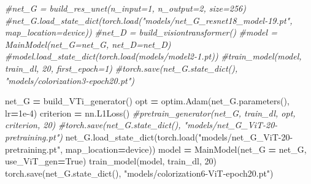 \documentclass[
]{article}
\newenvironment{Shaded}{\begin{snugshade}}{\end{snugshade}}
\newcommand{\CommentTok}[1]{\textcolor[rgb]{0.56,0.35,0.01}{\textit{#1}}}
\newcommand{\DecValTok}[1]{\textcolor[rgb]{0.00,0.00,0.81}{#1}}
\newcommand{\FloatTok}[1]{\textcolor[rgb]{0.00,0.00,0.81}{#1}}
\newcommand{\NormalTok}[1]{#1}
\newcommand{\OperatorTok}[1]{\textcolor[rgb]{0.81,0.36,0.00}{\textbf{#1}}}
\newcommand{\StringTok}[1]{\textcolor[rgb]{0.31,0.60,0.02}{#1}}
\newcommand{\VariableTok}[1]{\textcolor[rgb]{0.00,0.00,0.00}{#1}}
\begin{document}
\begin{Shaded}
\begin{Highlighting}[]
\CommentTok{\#net\_G = build\_res\_unet(n\_input=1, n\_output=2, size=256)}
\CommentTok{\#net\_G.load\_state\_dict(torch.load("models/net\_G\_resnet18\_model{-}19.pt", map\_location=device))}
\CommentTok{\#net\_D = build\_visiontransformer()}
\CommentTok{\#model = MainModel(net\_G=net\_G, net\_D=net\_D)}
\CommentTok{\#model.load\_state\_dict(torch.load(\textquotesingle{}models/model2{-}1.pt\textquotesingle{}))}
\CommentTok{\#train\_model(model, train\_dl, 20, first\_epoch=1)}
\CommentTok{\#torch.save(net\_G.state\_dict(), "models/colorization3{-}epoch20.pt")}
\end{Highlighting}
\end{Shaded}

\begin{Shaded}
\begin{Highlighting}[]
\NormalTok{net\_G }\OperatorTok{=}\NormalTok{ build\_VTi\_generator()}
\NormalTok{opt }\OperatorTok{=}\NormalTok{ optim.Adam(net\_G.parameters(), lr}\OperatorTok{=}\FloatTok{1e{-}4}\NormalTok{)}
\NormalTok{criterion }\OperatorTok{=}\NormalTok{ nn.L1Loss()        }
\CommentTok{\#pretrain\_generator(net\_G, train\_dl, opt, criterion, 20)}
\CommentTok{\#torch.save(net\_G.state\_dict(), "models/net\_G\_ViT{-}20{-}pretraining.pt")}
\NormalTok{net\_G.load\_state\_dict(torch.load(}\StringTok{"models/net\_G\_ViT{-}20{-}pretraining.pt"}\NormalTok{, map\_location}\OperatorTok{=}\NormalTok{device))}
\NormalTok{model }\OperatorTok{=}\NormalTok{ MainModel(net\_G }\OperatorTok{=}\NormalTok{ net\_G, use\_ViT\_gen}\OperatorTok{=}\VariableTok{True}\NormalTok{)}
\NormalTok{train\_model(model, train\_dl, }\DecValTok{20}\NormalTok{)}
\NormalTok{torch.save(net\_G.state\_dict(), }\StringTok{"models/colorization6{-}ViT{-}epoch20.pt"}\NormalTok{)}
\end{Highlighting}
\end{Shaded}
\end{document}
